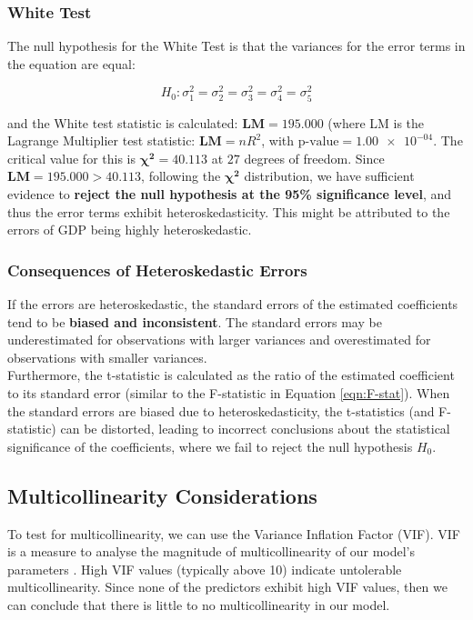 \documentclass{article}
\begin{document}
\subsubsection{White Test}
The null hypothesis for the White Test is that the variances for the error terms in the equation are equal:

\begin{equation}
    H_0: \sigma_1^2 = \sigma_2^2 = \sigma_3^2 = \sigma_4^2 = \sigma_5^2
\end{equation}

\noindent and the White test statistic is calculated: $\textbf{LM} \bm{= 195.000}$ (where LM is the Lagrange Multiplier test statistic: $\textbf{LM} = nR^2$, with $\text{p-value} = \num{1.00e-04}$. The critical value for this is $\bm{\chi^2 = 40.113}$ at $27$ degrees of freedom. Since $\textbf{LM} \bm{= 195.000 > 40.113}$, following the $\bm{\chi^2}$ distribution, we have sufficient evidence to \textbf{reject the null hypothesis at the 95\% significance level}, and thus the error terms exhibit heteroskedasticity. This might be attributed to the errors of GDP being highly heteroskedastic.

\subsubsection{Consequences of Heteroskedastic Errors}
If the errors are heteroskedastic, the standard errors of the estimated coefficients tend to be \textbf{biased and inconsistent}. The standard errors may be underestimated for observations with larger variances and overestimated for observations with smaller variances. \\

\noindent Furthermore, the t-statistic is calculated as the ratio of the estimated coefficient to its standard error (similar to the F-statistic in Equation \ref{eqn:F-stat}). When the standard errors are biased due to heteroskedasticity, the t-statistics (and F-statistic) can be distorted, leading to incorrect
conclusions about the statistical significance of the coefficients, where we fail to reject the null hypothesis $H_0$.

\subsection{Multicollinearity Considerations}
To test for multicollinearity, we can use the Variance Inflation Factor (VIF). VIF is a measure to analyse the magnitude of multicollinearity of our model's parameters \cite{James2013}. High VIF values (typically above 10) indicate untolerable multicollinearity. Since none of the predictors exhibit high VIF values, then we can conclude that there is little to no multicollinearity in our model.
\end{document}
